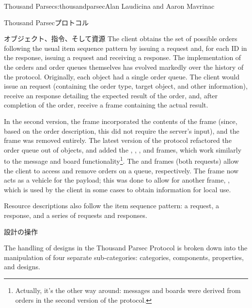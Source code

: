 \begin{aosachapter}{Thousand Parsec}{s:thousandparsec}{Alan Laudicina and Aaron Mavrinac}
\begin{aosasect1}{Thousand Parsecプロトコル}
\begin{aosasect2}{オブジェクト、指令、そして資源}
The client obtains the set of possible orders following the usual item
sequence pattern by issuing a  request
and, for each ID in the  response,
issuing a  request and receiving a
 response. The implementation of the orders
and order queues themselves has evolved markedly over the history of
the protocol. Originally, each object had a single order queue. The
client would issue an  request (containing the order type,
target object, and other information), receive an 
response detailing the expected result of the order, and, after
completion of the order, receive a  frame containing the
actual result.

In the second version, the  frame incorporated the
contents of the  frame (since, based on the order
description, this did not require the server's input), and the
 frame was removed entirely. The latest version of the
protocol refactored the order queue out of objects, and added the
, , , and  frames, which work similarly to
the message and board functionality\footnote{Actually, it's the other
way around: messages and boards were derived from orders in the
second version of the protocol.}.  The  and
 frames (both  requests) allow
the client to access and remove orders on a queue, respectively. The
 frame now acts as a vehicle for the 
payload; this was done to allow for another frame, ,
which is used by the client in some cases to obtain information for
local use.

Resource descriptions also follow the item sequence pattern: a
 request, a  response, and a series of  requests and  responses.

\end{aosasect2}

\begin{aosasect2}{設計の操作}

The handling of designs in the Thousand Parsec Protocol is broken down
into the manipulation of four separate sub-categories: categories,
components, properties, and designs.


\end{aosasect2}
\end{aosasect1}
\end{aosachapter}
